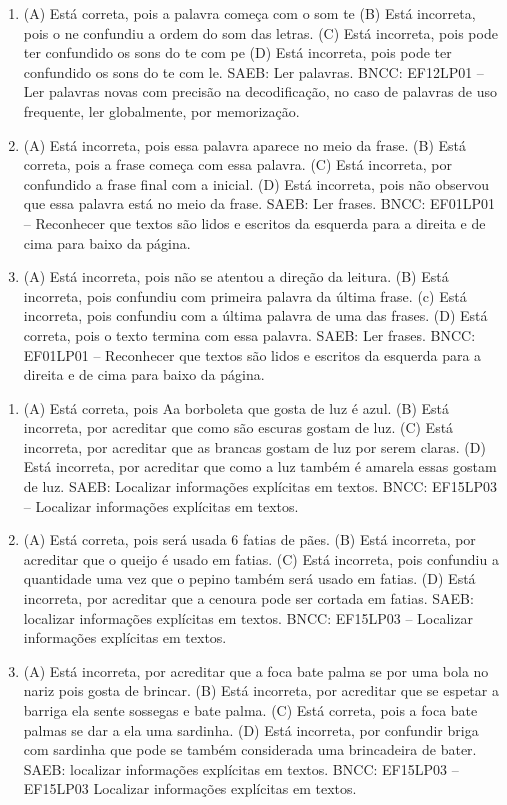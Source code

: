 \begin{enumerate}
\item
(A) Está correta, pois a palavra começa com o som te
(B) Está incorreta, pois o ne confundiu a ordem do som das letras.
(C) Está incorreta, pois pode ter confundido os sons do te com pe
(D) Está incorreta, pois pode ter confundido os sons do te com le.
SAEB: Ler palavras.
BNCC: EF12LP01 -- Ler palavras novas com precisão na decodificação, no caso
de palavras de uso frequente, ler globalmente, por memorização.

\item
(A) Está incorreta, pois essa palavra aparece no meio da frase.
(B) Está correta, pois a frase começa com essa palavra.
(C) Está incorreta, por confundido a frase final com a inicial.
(D) Está incorreta, pois não observou que essa palavra está no meio da frase.
SAEB: Ler frases.
BNCC: EF01LP01 -- Reconhecer que textos são lidos e escritos da esquerda
para a direita e de cima para baixo da página.

\item
(A) Está incorreta, pois não se atentou a direção da leitura.
(B) Está incorreta, pois confundiu com primeira palavra da última frase.
(c) Está incorreta, pois confundiu com a última palavra de uma das frases.
(D) Está correta, pois o texto termina com essa palavra.
SAEB: Ler frases.
BNCC: EF01LP01 -- Reconhecer que textos são lidos e escritos da esquerda
para a direita e de cima para baixo da página.
\end{enumerate}


\begin{enumerate}
\item
(A) Está correta, pois Aa borboleta que gosta de luz é azul.
(B) Está incorreta, por acreditar que como são escuras gostam de luz.
(C) Está incorreta, por acreditar que as brancas gostam de luz por serem claras.
(D) Está incorreta, por acreditar que como a luz também é amarela essas gostam de luz.
SAEB: Localizar informações explícitas em textos.
BNCC: EF15LP03 -- Localizar informações explícitas em textos.

\item
(A) Está correta, pois será usada 6 fatias de pães.
(B) Está incorreta, por acreditar que o queijo é usado em fatias.
(C) Está incorreta, pois confundiu a quantidade uma vez que o pepino também será usado em fatias.
(D) Está incorreta, por acreditar que a cenoura pode ser cortada em fatias.
SAEB: localizar informações explícitas em textos.
BNCC: EF15LP03 -- Localizar informações explícitas em textos.

\item
(A) Está incorreta, por acreditar que a foca bate palma se por uma bola
no nariz pois gosta de brincar.
(B) Está incorreta, por acreditar que se espetar a barriga ela sente
sossegas e bate palma.
(C) Está correta, pois a foca bate palmas se dar a ela uma sardinha.
(D) Está incorreta, por confundir briga com sardinha que pode se também
considerada uma brincadeira de bater.
SAEB: localizar informações explícitas em textos.
BNCC: EF15LP03 -- EF15LP03 Localizar informações explícitas em textos.
\end{enumerate}

